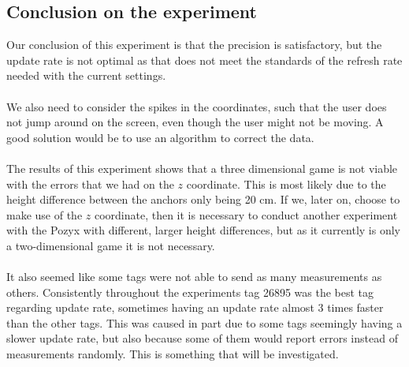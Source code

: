 \subsection{Conclusion on the experiment}
Our conclusion of this experiment is that the precision is satisfactory, but the update rate is not optimal as that does not meet the standards of the refresh rate needed with the current settings.
\\\\
We also need to consider the spikes in the coordinates, such that the user does not jump around on the screen, even though the user might not be moving.
A good solution would be to use an algorithm to correct the data.
\\\\
The results of this experiment shows that a three dimensional game is not viable with the errors that we had on the $z$ coordinate. 
This is most likely due to the height difference between the anchors only being 20 cm.
If we, later on, choose to make use of the $z$ coordinate, then it is necessary to conduct another experiment with the Pozyx with different, larger height differences, but as it currently is only a two-dimensional game it is not necessary.
\\\\
It also seemed like some tags were not able to send as many measurements as others.
Consistently throughout the experiments tag 26895 was the best tag regarding update rate, sometimes having an update rate almost 3 times faster than the other tags.
This was caused in part due to some tags seemingly having a slower update rate, but also because some of them would report errors instead of measurements randomly.
This is something that will be investigated.
